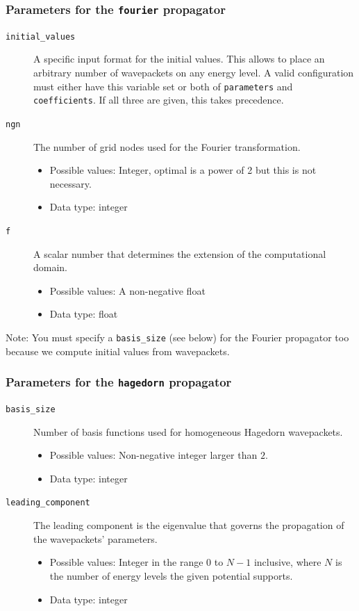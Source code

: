 \documentclass[a4paper,10pt]{report}
\begin{document}
\subsubsection{Parameters for the \texttt{fourier} propagator}

\begin{description}

  \item[\texttt{initial\_values}] A specific input format for the initial values.
    This allows to place an arbitrary number of wavepackets on any energy level.
    A valid configuration must either have this variable set or both of
    \texttt{parameters} and \texttt{coefficients}. If all three are given, this
    takes precedence.

  \item[\texttt{ngn}] The number of grid nodes used for the Fourier transformation.
  \begin{itemize}
    \item Possible values: Integer, optimal is a power of 2 but this is not necessary.
    \item Data type: integer
  \end{itemize}

  \item[\texttt{f}] A scalar number that determines the extension of the computational domain.
  \begin{itemize}
    \item Possible values: A non-negative float
    \item Data type: float
  \end{itemize}
\end{description}

Note: You must specify a \texttt{basis\_size} (see below) for the Fourier propagator too
because we compute initial values from wavepackets.

\subsubsection{Parameters for the \texttt{hagedorn} propagator}

\begin{description}
  \item[\texttt{basis\_size}] Number of basis functions used for homogeneous Hagedorn wavepackets.
  \begin{itemize}
    \item Possible values: Non-negative integer larger than $2$.
    \item Data type: integer
  \end{itemize}

  \item[\texttt{leading\_component}] The leading component is the eigenvalue that
    governs the propagation of the wavepackets' parameters.
  \begin{itemize}
    \item Possible values: Integer in the range $0$ to $N-1$ inclusive, where $N$
      is the number of energy levels the given potential supports.
    \item Data type: integer
  \end{itemize}
\end{description}
\end{document}
